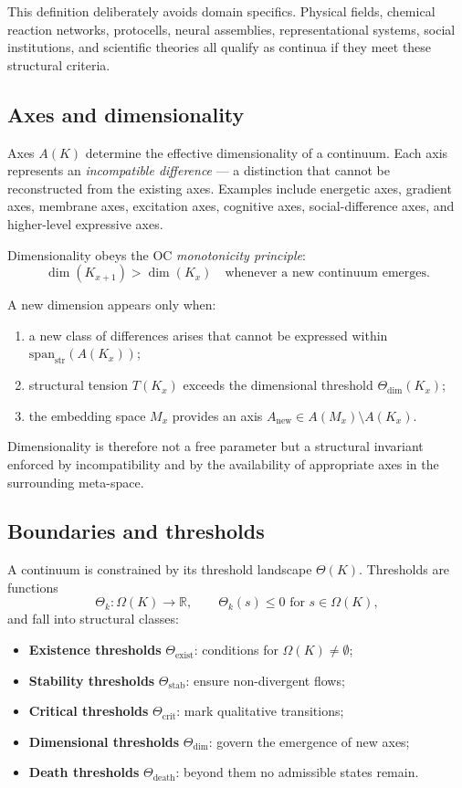 This definition deliberately avoids domain specifics.
Physical fields, chemical reaction networks, protocells, neural assemblies, representational systems, social institutions, and scientific theories all qualify as continua if they meet these structural criteria.

\subsection{Axes and dimensionality}

Axes \(A(K)\) determine the effective dimensionality of a continuum.
Each axis represents an \emph{incompatible difference} — a distinction that cannot be reconstructed from the existing axes.
Examples include energetic axes, gradient axes, membrane axes, excitation axes, cognitive axes, social-difference axes, and higher-level expressive axes.

Dimensionality obeys the OC \emph{monotonicity principle}:
\[
\dim(K_{x+1}) > \dim(K_x)
\quad\text{whenever a new continuum emerges}.
\]

A new dimension appears only when:

\begin{enumerate}
    \item a new class of differences arises that cannot be expressed within
          \(\mathrm{span}_{\mathrm{str}}(A(K_x))\);
    \item structural tension \(T(K_x)\) exceeds the dimensional threshold \(\Theta_{\mathrm{dim}}(K_x)\);
    \item the embedding space \(M_x\) provides an axis \(A_{\mathrm{new}}\in A(M_x)\setminus A(K_x)\).
\end{enumerate}

Dimensionality is therefore not a free parameter but a structural invariant enforced by incompatibility and by the availability of appropriate axes in the surrounding meta-space.

\subsection{Boundaries and thresholds}

A continuum is constrained by its threshold landscape \(\Theta(K)\).
Thresholds are functions
\[
\Theta_k : \Omega(K) \to \mathbb{R},
\qquad
\Theta_k(s)\le 0 \text{ for } s\in\Omega(K),
\]
and fall into structural classes:

\begin{itemize}
    \item \textbf{Existence thresholds} \(\Theta_{\mathrm{exist}}\): conditions for \(\Omega(K)\neq\emptyset\);
    \item \textbf{Stability thresholds} \(\Theta_{\mathrm{stab}}\): ensure non-divergent flows;
    \item \textbf{Critical thresholds} \(\Theta_{\mathrm{crit}}\): mark qualitative transitions;
    \item \textbf{Dimensional thresholds} \(\Theta_{\mathrm{dim}}\): govern the emergence of new axes;
    \item \textbf{Death thresholds} \(\Theta_{\mathrm{death}}\): beyond them no admissible states remain.
\end{itemize}

